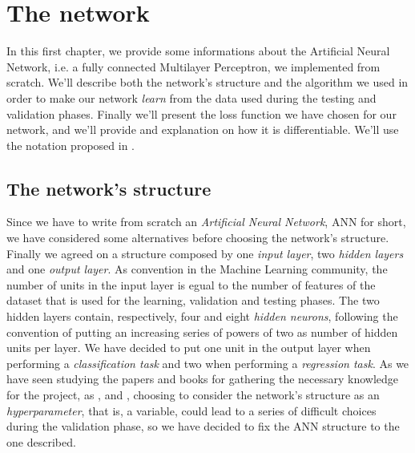\chapter{The network} %
\label{cha:the_network}
	\noindent
	In this first chapter, we provide some informations about the Artificial Neural Network, i.e. a fully
	connected Multilayer Perceptron, we implemented from scratch. We'll describe both the network's structure and
	the algorithm we used in order to make our network \textit{learn} from the data used during the testing and
	validation phases. Finally we'll present the loss function we have chosen for our network, and we'll provide
	and explanation on how it is differentiable. We'll use the notation proposed in \cite{Goodfellow-et-al-2016}.

	\section{The network's structure} %
	\label{sec:the_network_s_structure}
		\noindent
		Since we have to write from scratch an \textit{Artificial Neural Network}, ANN for short, we have
		considered some alternatives before choosing the network's structure. Finally we agreed on a structure
		composed by one \textit{input layer}, two \textit{hidden layers} and one \textit{output layer}. As
		convention in the Machine Learning community, the number of units in the input layer is egual to the number
		of features of the dataset that is used for the learning, validation and testing phases. The two
		hidden layers contain, respectively, four and eight \textit{hidden neurons}, following the convention of
		putting an increasing series of powers of two as number of hidden units per layer. We have decided to put
		one unit in the output layer when performing a \textit{classification task} and two when performing a
		\textit{regression task}. As we have seen studying the papers and books for gathering the necessary
		knowledge for the project, as \cite{Goodfellow-et-al-2016}, \cite{haykin2009neural} and
		\cite{mitchell1997machine}, choosing to consider the network's structure as an \textit{hyperparameter},
		that is, a variable, could lead to a series of difficult choices during the validation phase, so we have
		decided to fix the ANN structure to the one described.

